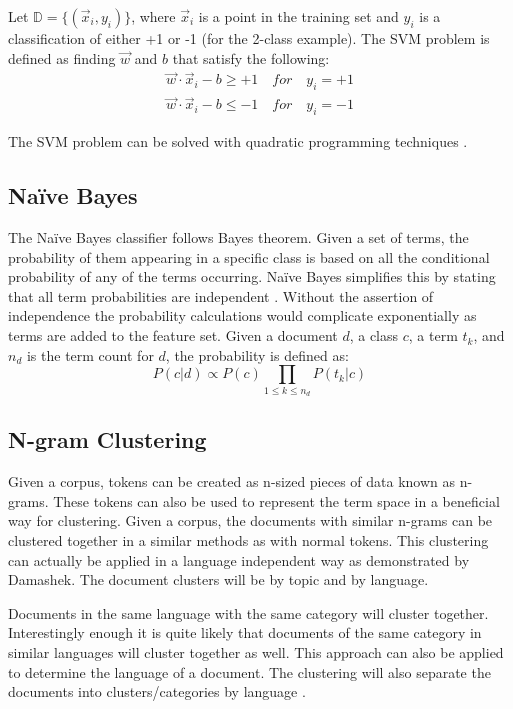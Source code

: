 \documentclass[11pt,twocolumn]{article}
\begin{document}
Let $\mathds{D} = \{(\vec{x}_i, y_i)\}$, where $\vec{x}_i$ is a point in the training set and $y_i$ is a classification of either +1 or -1 (for the 2-class example).  The SVM problem is defined as finding $\vec{w}$ and $b$ that satisfy the following:
\begin{eqnarray*}
\vec{w} \cdot \vec{x}_i - b \geq +1 \quad for \quad y_i = +1\\
\vec{w} \cdot \vec{x}_i - b \leq -1 \quad for \quad y_i = -1
\end{eqnarray*}

The SVM problem can be solved with quadratic programming techniques \cite{Yang1999}.

\subsection{Na\"{i}ve Bayes}
The Na\"{i}ve Bayes classifier follows Bayes theorem.  Given a set of terms, the probability of them appearing in a specific class is based on all the conditional probability of any of the terms occurring.  Na\"{i}ve Bayes simplifies this by stating that all term probabilities are independent \cite{Yang1999}.  Without the assertion of independence the probability calculations would complicate exponentially as terms are added to the feature set.  Given a document $d$, a class $c$, a term $t_k$, and $n_d$ is the term count for $d$, the probability is defined as:
\begin{equation*}
P(c|d) \propto P(c) \prod_{1 \leq k \leq n_d} P(t_k|c)
\end{equation*}

\subsection{N-gram Clustering}
Given a corpus, tokens can be created as n-sized pieces of data known as n-grams.  These tokens can also be used to represent the term space in a beneficial way for clustering.  Given a corpus, the documents with similar n-grams can be clustered together in a similar methods as with normal tokens.  This clustering can actually be applied in a language independent way as demonstrated by Damashek.  The document clusters will be by topic and by language.

Documents in the same language with the same category will cluster together.  Interestingly enough it is quite likely that documents of the same category in similar languages will cluster together as well.  This approach can also be applied to determine the language of a document.  The clustering will also separate the documents into clusters/categories by language \cite{Dama1995}.
\end{document}

